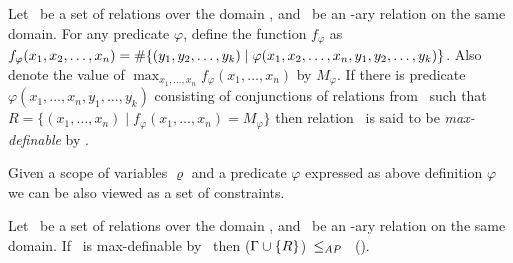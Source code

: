 \begin{defi}\label{def:max}
Let \mrelset\ be a set of relations over the domain \mD,
and \mR\ be an \mn-ary relation on the same domain. 
For any predicate \(\varphi\), define the function
\(f_\varphi\) as \(f_\varphi(x_1,x_2,\dotsc,x_n)=\#\{{(y_1,y_2,\dotsc,y_k) \mid
\varphi(x_1,x_2,\dotsc,x_n,y_1,y_2,\dotsc,y_k)}\}\)\@. Also denote the value of
\(\max_{x_1,\dotsc,x_n} f_\varphi(x_1,\dotsc,x_n)\) by \(M_\varphi\)\@.
If there is predicate \(\varphi(x_1,\dotsc,x_n,y_1,\dotsc,y_k)\) 
consisting of conjunctions of relations from \mrelset\ such that
 \(R=\{(x_1,\dotsc,x_n) \mid f_\varphi(x_1,\dotsc,x_n) = M_\varphi\}\) then
relation \mR\ is said to be \emph{max-definable} by \mrelset\@.
\end{defi} 

Given a scope of variables \(\varrho\) and a predicate \(\varphi\) expressed as above definition
\(\varphi\) we can be also viewed as a set of constraints.

\begin{theorem}[Maximization]\label{theo:max}
Let \mrelset\ be a set of relations over the domain \mD,
and \mR\ be an \mn-ary relation on the same domain. 
If \mR\ is max-definable by \mrelset\ then \ccsp(\(\Gamma \cup \{{R}\}\))~\(\le_{AP}\)~
\ccsp(\mrelset)\@.
\end{theorem}

